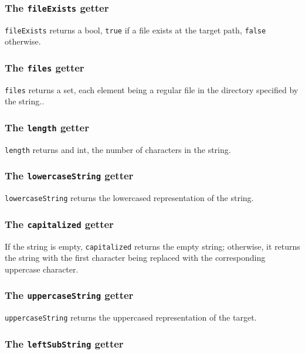 \documentclass[10pt,openright,twosides,final]{memoir}
\newcommand{\gtlinline}[1]{\colorbox{light-blue}{\lstinline[language=gtl]{#1}}}
\begin{document}
\subsubsection{The \texttt{fileExists} getter}

\gtlinline{fileExists} returns a bool, \gtlinline{true} if a file exists at the target path, \gtlinline{false} otherwise.

\subsubsection{The \texttt{files} getter}

\gtlinline{files} returns a set, each element being a regular file in the directory specified by the string..


\subsubsection{The \texttt{length} getter}

\gtlinline{length} returns and int, the number of characters in the string.

\subsubsection{The \texttt{lowercaseString} getter}

\gtlinline{lowercaseString} returns the lowercased representation of the string.

\subsubsection{The \texttt{capitalized} getter}

If the string is empty, \gtlinline{capitalized} returns the empty string; otherwise, it returns the string with the first character being replaced with the corresponding uppercase character.

\subsubsection{The \texttt{uppercaseString} getter}

\gtlinline{uppercaseString} returns the uppercased representation of the target.

\subsubsection{The \texttt{leftSubString} getter}
\end{document}
